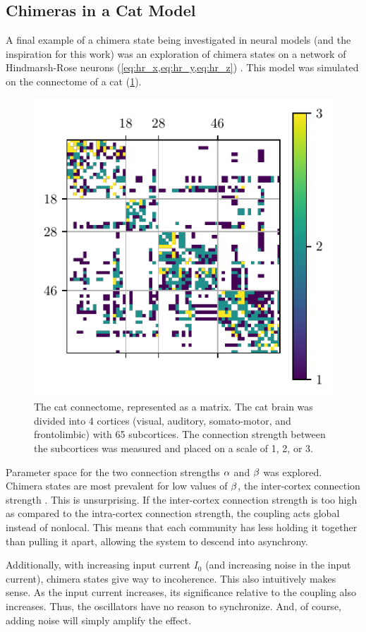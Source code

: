 \subsection{Chimeras in a Cat Model}
\label{sec:lit_review_chimera_cat}
A final example of a chimera state being investigated in neural models (and the inspiration for this work) was an exploration of chimera states on a network of Hindmarsh-Rose neurons (\cref{eq:hr_x,eq:hr_y,eq:hr_z}) \cite{Santos2017}.
This model was simulated on the connectome of a cat (\cref{fig:cat_matrix}).
\begin{figure}[ht]
  \centering
  \includegraphics{figure/cat_matrix}
  \caption[Cat connectome]{The cat connectome, represented as a matrix.
    The cat brain was divided into 4 cortices (visual, auditory, somato-motor, and frontolimbic) with 65 subcortices.
    The connection strength between the subcortices was measured and placed on a scale of 1, 2, or 3.
  }
  \label{fig:cat_matrix}
\end{figure}
Parameter space for the two connection strengths $\alpha$ and $\beta$ was explored.
Chimera states are most prevalent for low values of $\beta$, the inter-cortex connection strength \cite{Santos2017}.
This is unsurprising.
If the inter-cortex connection strength is too high as compared to the intra-cortex connection strength, the coupling acts global instead of nonlocal.
This means that each community has less holding it together than pulling it apart, allowing the system to descend into asynchrony.

Additionally, with increasing input current $I_{0}$ (and increasing noise in the input current), chimera states give way to incoherence.
This also intuitively makes sense.
As the input current increases, its significance relative to the coupling also increases.
Thus, the oscillators have no reason to synchronize.
And, of course, adding noise will simply amplify the effect.


